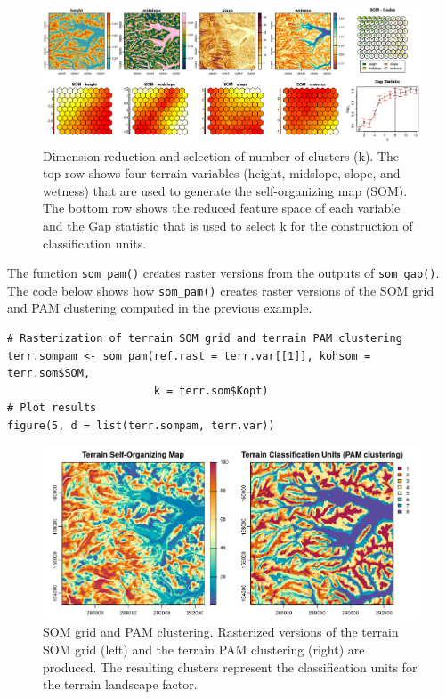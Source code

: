 \begin{figure}[H]

{\centering \includegraphics[width=1\linewidth,height=0.2\textheight]{figures/figure_4} 

}

\caption{Dimension reduction and selection of number of clusters (k). The top row shows four terrain variables (height, midslope, slope, and wetness) that are used to generate the self-organizing map (SOM). The bottom row shows the reduced feature space of each variable and the Gap statistic that is used to select k for the construction of classification units.}\label{fig:f4}
\end{figure}

The function \texttt{som\_pam()} creates raster versions from the outputs of
\texttt{som\_gap()}. The code below shows how \texttt{som\_pam()} creates raster versions of the
SOM grid and PAM clustering computed in the previous example.

\begin{verbatim}
# Rasterization of terrain SOM grid and terrain PAM clustering
terr.sompam <- som_pam(ref.rast = terr.var[[1]], kohsom = terr.som$SOM,
                       k = terr.som$Kopt)
# Plot results
figure(5, d = list(terr.sompam, terr.var))
\end{verbatim}

\begin{figure}[H]

{\centering \includegraphics[width=1\linewidth,height=0.25\textheight]{figures/figure_5} 

}

\caption{SOM grid and PAM clustering. Rasterized versions of the terrain SOM grid (left) and the terrain PAM clustering (right) are produced. The resulting clusters represent the classification units for the terrain landscape factor.}\label{fig:f5}
\end{figure}


